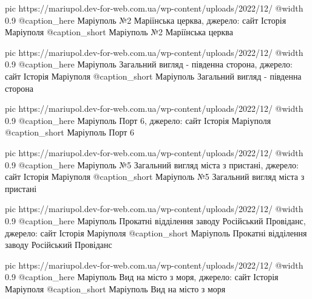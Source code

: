   pic https://mariupol.dev-for-web.com.ua/wp-content/uploads/2022/12/%
  @width 0.9
  @caption_here Маріуполь №2 Маріїнська церква, джерело: сайт Історія Маріуполя
  @caption_short Маріуполь №2 Маріїнська церква

  pic https://mariupol.dev-for-web.com.ua/wp-content/uploads/2022/12/%
  @width 0.9
  @caption_here Маріуполь Загальний вигляд - південна сторона, джерело: сайт Історія Маріуполя
  @caption_short Маріуполь Загальний вигляд - південна сторона

  pic https://mariupol.dev-for-web.com.ua/wp-content/uploads/2022/12/%
  @width 0.9
  @caption_here Маріуполь Порт 6, джерело: сайт Історія Маріуполя
  @caption_short Маріуполь Порт 6

  pic https://mariupol.dev-for-web.com.ua/wp-content/uploads/2022/12/%
  @width 0.9
  @caption_here Маріуполь №5 Загальний вигляд міста з пристані, джерело: сайт Історія Маріуполя
  @caption_short Маріуполь №5 Загальний вигляд міста з пристані

  pic https://mariupol.dev-for-web.com.ua/wp-content/uploads/2022/12/%
  @width 0.9
  @caption_here Маріуполь Прокатні відділення заводу Російський Провіданс, джерело: сайт Історія Маріуполя
  @caption_short Маріуполь Прокатні відділення заводу Російський Провіданс

  pic https://mariupol.dev-for-web.com.ua/wp-content/uploads/2022/12/%
  @width 0.9
  @caption_here Маріуполь Вид на місто з моря, джерело: сайт Історія Маріуполя
  @caption_short Маріуполь Вид на місто з моря

